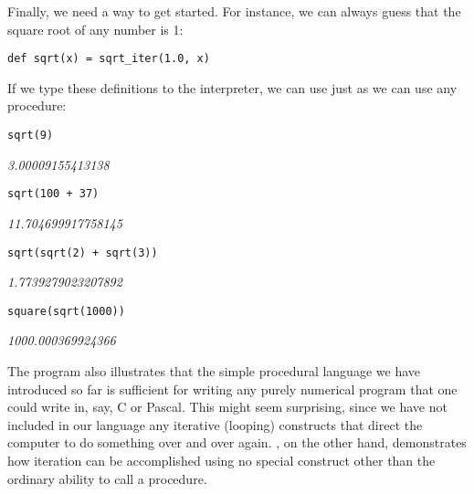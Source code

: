 Finally, we need a way to get started. For instance, we can always guess that the square root of any number is 1:

\begin{lstlisting}
def sqrt(x) = sqrt_iter(1.0, x)
\end{lstlisting}

If we type these definitions to the interpreter, we can use  just as we can use any procedure:

\begin{lstlisting}
sqrt(9)
\end{lstlisting}
\textit{3.00009155413138}

\begin{lstlisting}
sqrt(100 + 37)
\end{lstlisting}
\textit{11.704699917758145}

\begin{lstlisting}
sqrt(sqrt(2) + sqrt(3))
\end{lstlisting}
\textit{1.7739279023207892}

\begin{lstlisting}
square(sqrt(1000))
\end{lstlisting}
\textit{1000.000369924366}

The  program also illustrates that the simple procedural language we have introduced so far is sufficient for writing any purely numerical program that one could write in, say, C or Pascal. This might seem surprising, since we have not included in our language any iterative (looping) constructs that direct the computer to do something over and over again. , on the other hand, demonstrates how iteration can be accomplished using no special construct other than the ordinary ability to call a procedure.


